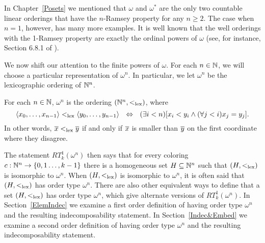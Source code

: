 In Chapter~\ref{Posets} we mentioned that $\omega$ and $\omega^*$
are the only two countable linear orderings
that have the $n$-Ramsey property for any $n\geq 2$.
The case when $n=1$, however, has many more examples.
It is well known that the well orderings with the 1-Ramsey
property are exactly the ordinal powers of $\omega$
(see, for instance, Section 6.8.1 of \cite{Fraisse:ThR}).

We now shift our attention to the finite powers of $\omega$.
For each $n\in\mathbb{N}$, we will choose a particular representation of $\omega^n$.
In particular, we let $\omega^n$ be the lexicographic ordering of $\mathbb{N}^n$.

\begin{definition}
For each $n\in\mathbb{N}$, $\omega^n$ is the ordering $(\mathbb{N}^n, <_{\mathrm{lex}})$, \index{$\lex$}
where
$$\seq{x_0,\ldots,x_{n-1}}\lex\seq{y_0,\ldots,y_{n-1}}\ \ \Leftrightarrow\ \ (\exists i<n)[x_i<y_i\land(\forall j<i)x_j=y_j].$$
In other words, $\overline{x}<_{\mathrm{lex}}\overline{y}$ if and only if $\overline{x}$
is smaller than $\overline{y}$ on the first coordinate where they disagree.
\end{definition}

The statement $RT^1_k(\omega^n)$ then says that for every coloring
$c:\mathbb{N}^n\to\{0,1\ldots,k-1\}$ there is a homogeneous set
$H\subseteq\mathbb{N}^n$ such that $(H,<_{\mathrm{lex}})$ is isomorphic to $\omega^n$.
When $(H,<_{\mathrm{lex}})$ is isomorphic to $\omega^n$, it is often said
that $(H,<_{\mathrm{lex}})$ has order type $\omega^n$.
There are also other equivalent ways to define that a set
$(H,<_{\mathrm{lex}})$ has order type $\omega^n$, which give alternate
versions of $RT^1_k(\omega^n)$.
In Section~\ref{ElemIndec} we examine a first order definition
of having order type $\omega^n$ and the resulting indecomposability statement.
In Section~\ref{Indec&Embed} we examine a second order definition
of having order type $\omega^n$ and the resulting indecomposability statement.

